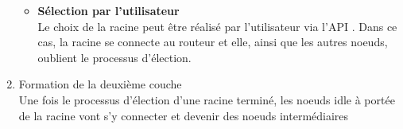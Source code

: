 \begin{enumerate}
\begin{itemize}
                    \item \textbf{Sélection par l'utilisateur}\\
                        Le choix de la racine peut être réalisé par l'utilisateur via l'\textsc{API} \espmesh.
                        Dans ce cas, la racine se connecte au routeur et elle, ainsi que les autres noeuds, oublient le processus
                        d'élection.
                \end{itemize}
            \item Formation de la deuxième couche\\
                Une fois le processus d'élection d'une racine terminé,
                les noeuds idle à portée de la racine vont s'y connecter et devenir des noeuds intermédiaires
            

\end{enumerate}
